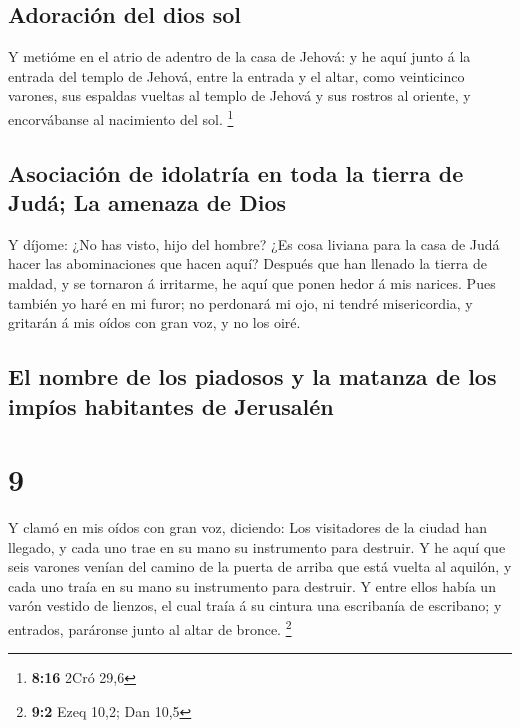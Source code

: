 \hypertarget{adoraciuxf3n-del-dios-sol}{%
\subsection{Adoración del dios sol}\label{adoraciuxf3n-del-dios-sol}}

 Y metióme en el atrio de adentro de la casa de Jehová: y
he aquí junto á la entrada del templo de Jehová, entre la entrada y el
altar, como veinticinco varones, sus espaldas vueltas al templo de
Jehová y sus rostros al oriente, y encorvábanse al nacimiento del sol.
\footnote{\textbf{8:16} 2Cró 29,6}

\hypertarget{asociaciuxf3n-de-idolatruxeda-en-toda-la-tierra-de-juduxe1-la-amenaza-de-dios}{%
\subsection{Asociación de idolatría en toda la tierra de Judá; La
amenaza de
Dios}\label{asociaciuxf3n-de-idolatruxeda-en-toda-la-tierra-de-juduxe1-la-amenaza-de-dios}}

 Y díjome: ¿No has visto, hijo del hombre? ¿Es cosa liviana
para la casa de Judá hacer las abominaciones que hacen aquí? Después que
han llenado la tierra de maldad, y se tornaron á irritarme, he aquí que
ponen hedor á mis narices.  Pues también yo haré en mi
furor; no perdonará mi ojo, ni tendré misericordia, y gritarán á mis
oídos con gran voz, y no los oiré.

\hypertarget{el-nombre-de-los-piadosos-y-la-matanza-de-los-impuxedos-habitantes-de-jerusaluxe9n}{%
\subsection{El nombre de los piadosos y la matanza de los impíos
habitantes de
Jerusalén}\label{el-nombre-de-los-piadosos-y-la-matanza-de-los-impuxedos-habitantes-de-jerusaluxe9n}}

\hypertarget{section-8}{%
\section{9}\label{section-8}}

 Y clamó en mis oídos con gran voz, diciendo: Los
visitadores de la ciudad han llegado, y cada uno trae en su mano su
instrumento para destruir.  Y he aquí que seis varones
venían del camino de la puerta de arriba que está vuelta al aquilón, y
cada uno traía en su mano su instrumento para destruir. Y entre ellos
había un varón vestido de lienzos, el cual traía á su cintura una
escribanía de escribano; y entrados, paráronse junto al altar de bronce.
\footnote{\textbf{9:2} Ezeq 10,2; Dan 10,5}

